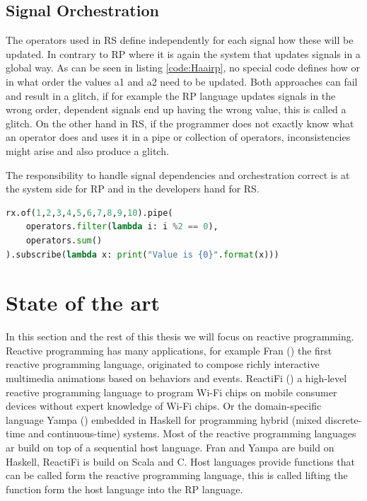 \documentclass[a4paper]{book}
\begin{document}
\subsection{Signal Orchestration}
The operators used in RS define independently for each signal how these will be updated. In contrary to RP where it is again the system that updates signals in a global way. As can be seen in listing \ref{code:Haairp}, no special code defines how or in what order the values a1 and a2 need to be updated. Both approaches can fail and result in a glitch, if for example the RP language updates signals in the wrong order, dependent signals end up having the wrong value, this is called a glitch. On the other hand in RS, if the programmer does not exactly know what an operator does and uses it in a pipe or collection of operators, inconsistencies might arise and also produce a glitch. 

\vspace{1em} %
\noindent
The responsibility to handle signal dependencies and orchestration correct is at the system side for RP and in the developers hand for RS.


\begin{lstlisting}[language=Python, caption={Python, RxPy library}, label={code:rxpy}, basicstyle=\small\ttfamily, frame=single]
rx.of(1,2,3,4,5,6,7,8,9,10).pipe(
	operators.filter(lambda i: i %2 == 0),
	operators.sum()
).subscribe(lambda x: print("Value is {0}".format(x)))
\end{lstlisting}





\section{State of the art}

In this section and the rest of this thesis we will focus on reactive programming. Reactive programming has many applications, for example Fran (\cite{DBLP:conf/icfp/ElliottH97}) the first reactive programming language, originated to compose richly interactive multimedia animations based on behaviors and events. ReactiFi (\cite{DBLP:journals/programming/SterzEMBGHMF21}) a high-level reactive programming language to program Wi-Fi chips on mobile consumer devices without expert knowledge of Wi-Fi chips. Or the domain-specific language Yampa (\cite{DBLP:conf/haskell/CourtneyNP03}) embedded in Haskell for programming hybrid (mixed discrete-time and continuous-time) systems. Most of the reactive programming languages ar build on top of a sequential host language. Fran and Yampa are build on Haskell, ReactiFi is build on Scala and C. Host languages provide functions that can be called form the reactive programming language, this is called lifting the function form the host language into the RP language. 
\end{document}
